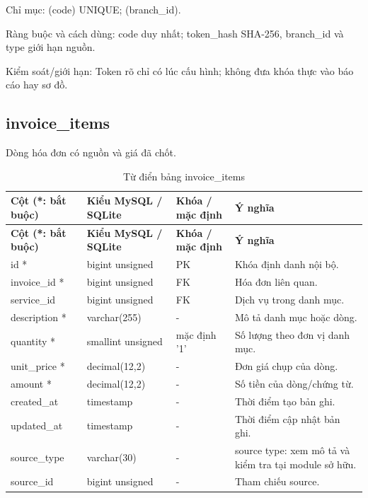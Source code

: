 Chỉ mục:\allowbreak{} (code) UNIQUE; (branch\_\allowbreak{}id).\allowbreak{}

Ràng buộc và cách dùng:\allowbreak{} code duy nhất; token\_\allowbreak{}hash SHA-256, branch\_\allowbreak{}id và type giới hạn nguồn.\allowbreak{}

Kiểm soát/\allowbreak{}giới hạn:\allowbreak{} Token rõ chỉ có lúc cấu hình; không đưa khóa thực vào báo cáo hay sơ đồ.\allowbreak{}

\clearpage

\subsection{invoice\_\allowbreak{}items}
Dòng hóa đơn có nguồn và giá đã chốt.\allowbreak{}


{\fontsize{10}{12}\selectfont\setlength{\tabcolsep}{3pt}\renewcommand{\arraystretch}{1.12}
\begin{longtable}{@{}L{\textwidth-4.86pt\relax} L{\textwidth-3.96pt\relax} L{\textwidth-2.88pt\relax} L{\textwidth-6.3pt\relax}@{}}
\caption{Từ điển bảng invoice\_\allowbreak{}items}\\
\toprule
\textbf{Cột (*:\allowbreak{} bắt buộc)} & \textbf{Kiểu My\allowbreak{}SQL /\allowbreak{} SQLite} & \textbf{Khóa /\allowbreak{} mặc định} & \textbf{Ý nghĩa}\\\midrule
\endfirsthead
\toprule
\textbf{Cột (*:\allowbreak{} bắt buộc)} & \textbf{Kiểu My\allowbreak{}SQL /\allowbreak{} SQLite} & \textbf{Khóa /\allowbreak{} mặc định} & \textbf{Ý nghĩa}\\\midrule
\endhead
\bottomrule\endlastfoot
id * & bigint unsigned & PK & Khóa định danh nội bộ.\allowbreak{}\\[1pt]
invoice\_\allowbreak{}id * & bigint unsigned & FK & Hóa đơn liên quan.\allowbreak{}\\[1pt]
service\_\allowbreak{}id & bigint unsigned & FK & Dịch vụ trong danh mục.\allowbreak{}\\[1pt]
description * & varchar(255) & - & Mô tả danh mục hoặc dòng.\allowbreak{}\\[1pt]
quantity * & smallint unsigned & mặc định '1' & Số lượng theo đơn vị danh mục.\allowbreak{}\\[1pt]
unit\_\allowbreak{}price * & decimal(12,2) & - & Đơn giá chụp của dòng.\allowbreak{}\\[1pt]
amount * & decimal(12,2) & - & Số tiền của dòng/\allowbreak{}chứng từ.\allowbreak{}\\[1pt]
created\_\allowbreak{}at & timestamp & - & Thời điểm tạo bản ghi.\allowbreak{}\\[1pt]
updated\_\allowbreak{}at & timestamp & - & Thời điểm cập nhật bản ghi.\allowbreak{}\\[1pt]
source\_\allowbreak{}type & varchar(30) & - & source type:\allowbreak{} xem mô tả và kiểm tra tại module sở hữu.\allowbreak{}\\[1pt]
source\_\allowbreak{}id & bigint unsigned & - & Tham chiếu source.\allowbreak{}\\[1pt]
\end{longtable}}
